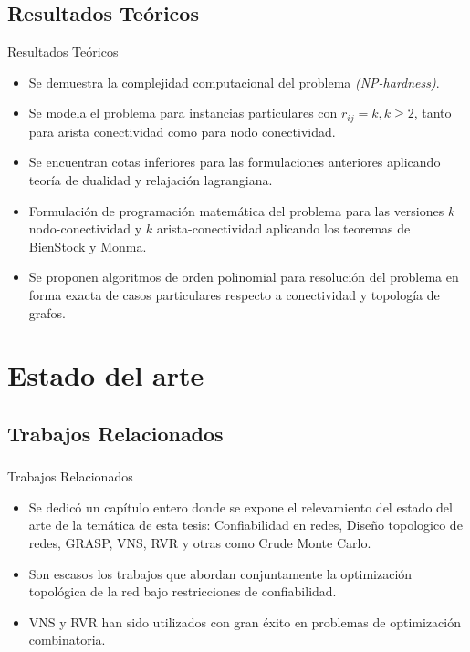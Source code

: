 \subsection{Resultados Teóricos}
\begin{frame}%
    \begin{block}{Resultados Teóricos}
    \begin{small}
		\begin{itemize} 
    		\item Se demuestra la complejidad computacional del problema \emph{(NP-hardness)}.
			\item Se modela el problema para instancias particulares con $r_{ij} = k, k \geq 2$, tanto para arista conectividad como para nodo conectividad.
			\item Se encuentran cotas inferiores para las formulaciones anteriores aplicando teoría de dualidad y relajación lagrangiana.
	    	\item Formulación de programación matemática del problema para las versiones $k$ nodo-conectividad y $k$ arista-conectividad aplicando los teoremas de BienStock y Monma.
    		\item Se proponen algoritmos de orden polinomial para resolución del problema en forma exacta de casos particulares respecto a conectividad y topología de grafos.
    	\end{itemize} 
    			\end{small}
    \end{block}
\end{frame}

\section{Estado del arte}
\subsection{Trabajos Relacionados}
\begin{frame}\frametitle{}
\begin{block}{Trabajos Relacionados}
	\begin{itemize} 
    	\item Se dedicó un capítulo entero donde se expone el relevamiento del estado del arte de la temática de esta tesis: Confiabilidad en redes, Diseño topologico de redes, GRASP, VNS, RVR y otras como Crude Monte Carlo.
    	\item Son escasos los trabajos que abordan conjuntamente la optimización topológica de la red  bajo restricciones de confiabilidad.
    	\item VNS y RVR han sido utilizados con gran éxito en problemas de optimización combinatoria.
    \end{itemize} 
\end{block}
\end{frame}


